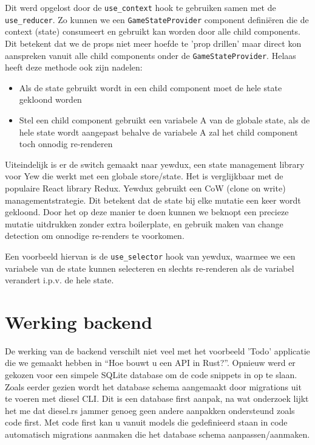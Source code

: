 Dit werd opgelost door de \texttt{use_context} hook te gebruiken samen met de
\texttt{use_reducer}. Zo kunnen we een \texttt{GameStateProvider} component
definiëren die de context (state) consumeert en gebruikt kan worden door alle child components. Dit
betekent dat we de props niet meer hoefde te 'prop drillen' maar direct kon aanspreken vanuit alle
child components onder de \texttt{GameStateProvider}. Helaas heeft deze methode ook zijn
nadelen: 
\begin{itemize}
    \item Als de state gebruikt wordt in een child component moet de hele state gekloond worden 

    \item Stel een child component gebruikt een variabele A van de globale state, als de hele state
    wordt aangepast behalve de variabele A zal het child component toch onnodig re-renderen 
\end{itemize}

Uiteindelijk is er de switch gemaakt naar yewdux, een state management library voor Yew die werkt
met een globale store/state. Het is verglijkbaar met de populaire React library Redux. Yewdux
gebruikt een CoW (clone on write) managementstrategie. Dit betekent dat de state bij elke mutatie
een keer wordt gekloond. Door het op deze manier te doen kunnen we beknopt een precieze mutatie
uitdrukken zonder extra boilerplate, en gebruik maken van change detection om onnodige re-renders te
voorkomen. 

Een voorbeeld hiervan is de \texttt{use_selector} hook van yewdux, waarmee we een
variabele van de state kunnen selecteren en slechts re-renderen als de variabel verandert i.p.v. de
hele state.

\clearpage

\section{Werking backend}

De werking van de backend verschilt niet veel met het voorbeeld 'Todo' applicatie die we gemaakt
hebben in \enquote{Hoe bouwt u een API in Rust?}. Opnieuw werd er gekozen voor een simpele SQLite database
om de code snippets in op te slaan. Zoals eerder gezien wordt het database schema aangemaakt door
migrations uit te voeren met diesel CLI.  Dit is een database first aanpak, na wat onderzoek lijkt
het me dat diesel.rs jammer genoeg geen andere aanpakken ondersteund zoals code first. Met code
first kan u vanuit models die gedefinieerd staan in code automatisch migrations aanmaken die het
database schema aanpassen/aanmaken. 

